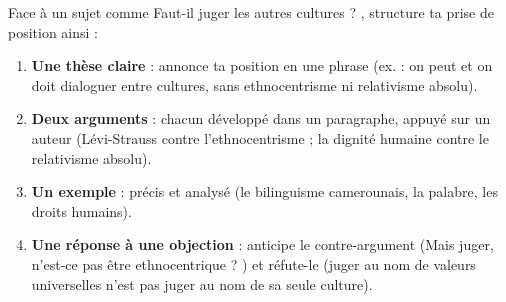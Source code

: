 \documentclass[11pt]{article}
\begin{document}
\begin{methode}
Face à un sujet comme \guillemotleft Faut-il juger les autres cultures ? \guillemotright, structure ta prise de position ainsi :
\begin{enumerate}
\item \textbf{Une thèse claire} : annonce ta position en une phrase (ex. : on peut et on doit dialoguer entre cultures, sans ethnocentrisme ni relativisme absolu).
\item \textbf{Deux arguments} : chacun développé dans un paragraphe, appuyé sur un auteur (Lévi-Strauss contre l'ethnocentrisme ; la dignité humaine contre le relativisme absolu).
\item \textbf{Un exemple} : précis et analysé (le bilinguisme camerounais, la palabre, les droits humains).
\item \textbf{Une réponse à une objection} : anticipe le contre-argument (\guillemotleft Mais juger, n'est-ce pas être ethnocentrique ? \guillemotright) et réfute-le (juger au nom de valeurs universelles n'est pas juger au nom de sa seule culture).
\end{enumerate}
\end{methode}
\end{document}
